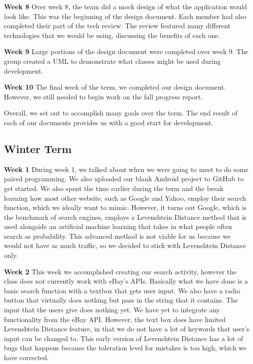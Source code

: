 \documentclass[journal,compsoc, 10pt, draftclsnofoot, onecolumn]{IEEEtran}
\begin{document}
\textbf{Week 8}\newline
Over week 8, the team did a mock design of what the application would look like. 
This was the beginning of the design document. Each member had also completed 
their part of the tech review. The review featured many different technologies that 
we would be using, discussing the benefits of each one. \newline

\textbf{Week 9}\newline
Large portions of the design document were completed over week 9. The group 
created a UML to demonstrate what classes might be used during development. 
\newline

\textbf{Week 10}\newline
The final week of the term, we completed our design document. However, we still 
needed to begin work on the fall progress report. \newline

Overall, we set out to accomplish many goals over the term. The end result of 
each of our documents provides us with a good start for development. 

\subsection{Winter Term}
\textbf{Week 1}\newline
During week 1, we talked about when we were going to meet to do some paired 
programming. We also uploaded our blank Android project to GitHub to get 
started. We also spent the time earlier during the term and the break learning 
how most other website, such as Google and Yahoo, employ their search 
function, which we ideally want to mimic. However, it turns out Google, 
which is the benchmark of search engines, employs a Levenshtein Distance
 method that is used alongside an artificial machine learning that takes in 
what people often search as probability. This advanced method is not viable 
for us because we would not have as much traffic, so we decided to stick with 
Levenshtein Distance only. \newline

\textbf{Week 2}\newline
This week we accomplished creating our search activity, however the class does 
not currently work with eBay's APIs. Basically what we have done is a basic 
search function with a textbox that gets user input. We also have a radio button 
that virtually does nothing but pass in the string that it contains. The input that 
the users give does nothing yet. We have yet to integrate any functionality from 
the eBay API. However, the text box does have limited Levenshtein Distance 
feature, in that we do not have a lot of keywords that user's input can be 
changed to. This early version of Levenshtein Distance has a lot of bugs that 
happens because the toleration level for mistakes is too high, which we have 
corrected.  \newline
\end{document}
